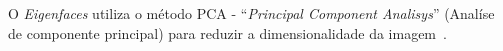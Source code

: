 O \textit{Eigenfaces} utiliza o método PCA - ``\textit{Principal Component Analisys}'' (Analíse de componente principal) para reduzir a dimensionalidade da imagem~\cite{hewitt}.







